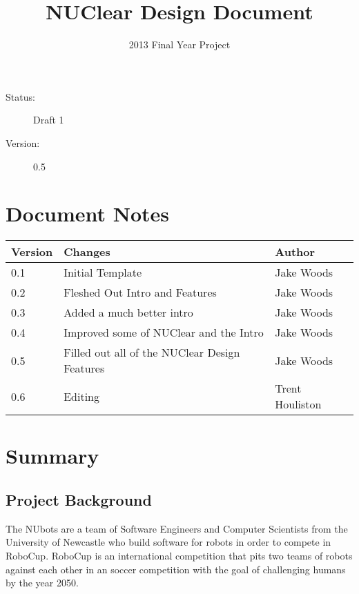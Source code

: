 \documentclass[english,12pt]{scrartcl}
\title{NUClear Design Document}
\author{2013 Final Year Project}
\begin{document}
	\maketitle
	\vfill
	{\large
		\begin{description}
			\item [Status:] Draft 1
			\item [Version:] 0.5
		\end{description}}

	\clearpage
	\tableofcontents

	\section{Document Notes}
		\begin{tabular}{ p{} | p{} | p{} }
			\textbf{Version} & \textbf{Changes} & \textbf{Author} \\
			\hline

			0.1 &
			Initial Template &
			Jake Woods \\
			\hline

			0.2 &
			Fleshed Out Intro and Features &
			Jake Woods \\
			\hline
			
			0.3 &
			Added a much better intro &
			Jake Woods \\
			\hline
			
			0.4 &
			Improved some of NUClear and the Intro &
			Jake Woods \\
			\hline
			
			0.5 &
			Filled out all of the NUClear Design Features &
			Jake Woods \\
			\hline
			
			0.6 &
			Editing &
			Trent Houliston \\
			\hline
		\end{tabular}
		
	\clearpage
		
	\section{Summary}
		\subsection{Project Background}
			The NUbots are a team of Software Engineers and Computer Scientists from the University of Newcastle who build software for robots in order to compete in RoboCup.
			RoboCup is an international competition that pits two teams of robots against each other in an soccer competition with the goal of challenging humans by the year 2050.
			
\end{document}
